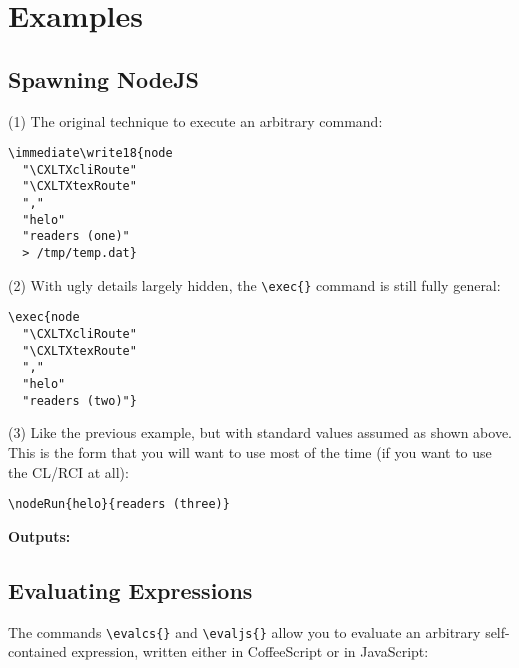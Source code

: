 



\section{Examples}\label{examples}

\subsection{Spawning NodeJS}\label{spawningnodejs}

(1) The original technique to execute an arbitrary command:
\begin{verbatim}
\immediate\write18{node
  "\CXLTXcliRoute"
  "\CXLTXtexRoute"
  ","
  "helo"
  "readers (one)"
  > /tmp/temp.dat}
\end{verbatim}

(2) With ugly details largely hidden, the \verb#\exec{}# command is still fully general:
\begin{verbatim}
\exec{node
  "\CXLTXcliRoute"
  "\CXLTXtexRoute"
  ","
  "helo"
  "readers (two)"}
\end{verbatim}

(3) Like the previous example, but with standard values assumed as shown above. This is the form that you
will want to use most of the time (if you want to use the CL/RCI at all):
\begin{verbatim}
\nodeRun{helo}{readers (three)}
\end{verbatim}


{\textbf{Outputs:}}

\immediate{}





\subsection{Evaluating Expressions}\label{evalcs}

The commands \verb#\evalcs{}# and \verb#\evaljs{}# allow you to evaluate an arbitrary self-contained
expression, written either in CoffeeScript or in JavaScript:


